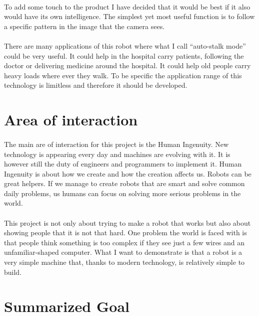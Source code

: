 \documentclass[12pt,a4paper]{report}
\begin{document}
\paragraph{}
To add some touch to the product I have decided that it would be best if it also would have its own intelligence. The simplest yet most useful function is to follow a specific pattern in the image that the camera sees.

\paragraph{}
There are many applications of this robot where what I call “auto-stalk mode” could be very useful. It could help in the hospital carry patients, following the doctor or delivering medicine around the hospital. It could help old people carry heavy loads where ever they walk. To be specific the application range of this technology is limitless and therefore it should be developed.

\section{Area of interaction}

\paragraph{}
The main are of interaction for this project is the Human Ingenuity. New technology is appearing every day and machines are evolving with it. It is however still the duty of engineers and programmers to implement it. Human Ingenuity is about how we create and how the creation affects us. Robots can be great helpers. If we manage to create robots that are smart and solve common daily problems, us humans can focus on solving more serious problems in the world. 

\paragraph{}
This project is not only about trying to make a robot that works but also about showing people that it is not that hard. One problem the world is faced with is that people think something is too complex if they see just a few wires and an unfamiliar-shaped computer. What I want to demonstrate is that a robot is a very simple machine that, thanks to modern technology, is relatively simple to build.

\section{Summarized Goal}
\end{document}
